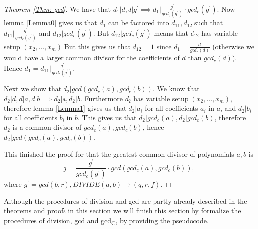 \begin{proof}[Theorem \ref{Thm: gcd}]
  We have that $d_1|d, d|g^\prime \implies d_1\Big|\frac{g^\prime}{gcd_c(g^\prime)}\cdot gcd_c(g^\prime)$. Now lemma \ref{Lemma0} gives us that $d_1$ can be factored into $d_{11},d_{12}$ such that $d_{11}\Big|\frac{g^\prime}{gcd_c(g^\prime)}$ and $d_{12}|gcd_c(g^\prime)$. But $d_{12}|gcd_c(g^\prime)$ means that $d_{12}$ has variable setup $(x_2,\ldots,x_m)$ But this gives us that $d_{12}=1$ since $d_1=\frac{d}{gcd_c(d)}$ (otherwise we would have a larger common divisor for the coefficients of $d$ than $gcd_c(d)$). Hence $d_1=d_{11}\Big|\frac{g^\prime}{gcd_c(g^\prime)}$.

  Next we show that $d_2|gcd(gcd_c(a),gcd_c(b))$. We know that $d_2|d, d|a, d|b \implies d_2|a, d_2|b$. Furthermore $d_2$ has variable setup $(x_2,\ldots,x_m)$, therefore lemma \ref{Lemma1} gives us that $d_2|a_i$ for all coefficients $a_i$ in $a$, and $d_2|b_i$ for all coefficients $b_i$ in $b$. This gives us that $d_2|gcd_c(a), d_2|gcd_c(b)$, therefore $d_2$ is a common divisor of $gcd_c(a),gcd_c(b)$, hence $d_2|gcd(gcd_c(a),gcd_c(b))$.

  This finished the proof for that the greatest common divisor of polynomials $a,b$ is
  \begin{equation}
    g=\frac{g^\prime}{gcd_c(g^\prime)}\cdot gcd(gcd_c(a),gcd_c(b)),
  \end{equation}
  where $g^\prime=gcd(b,r), DIVIDE(a,b) \rightarrow (q,r,f)$.
\end{proof}
Although the procedures of division and gcd are partly already described in the theorems and proofs in this section we will finish this section by formalize the procedures of division, gcd and gcd\textsubscript{C}, by providing the pseudocode.

